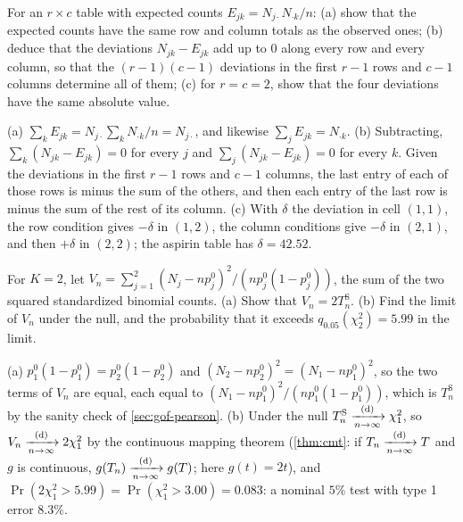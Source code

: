 \begin{exercise}
\label{ex:gof-table-df}
For an $r \times c$ table with expected counts $E_{jk} = N_{j\cdot}N_{\cdot k}/n$: (a) show that the expected counts have the same row and column totals as the observed ones; (b) deduce that the deviations $N_{jk} - E_{jk}$ add up to $0$ along every row and every column, so that the $(r - 1)(c - 1)$ deviations in the first $r - 1$ rows and $c - 1$ columns determine all of them; (c) for $r = c = 2$, show that the four deviations have the same absolute value.
\end{exercise}
\begin{solution}
(a) $\sum_kE_{jk} = N_{j\cdot}\sum_kN_{\cdot k}/n = N_{j\cdot}$, and likewise $\sum_jE_{jk} = N_{\cdot k}$. (b) Subtracting, $\sum_k(N_{jk} - E_{jk}) = 0$ for every $j$ and $\sum_j(N_{jk} - E_{jk}) = 0$ for every $k$. Given the deviations in the first $r - 1$ rows and $c - 1$ columns, the last entry of each of those rows is minus the sum of the others, and then each entry of the last row is minus the sum of the rest of its column. (c) With $\delta$ the deviation in cell $(1, 1)$, the row condition gives $-\delta$ in $(1, 2)$, the column conditions give $-\delta$ in $(2, 1)$, and then $+\delta$ in $(2, 2)$; the aspirin table has $\delta = 42.52$.
\end{solution}

\begin{exercise}
\label{ex:gof-naive}
For $K = 2$, let $V_n = \sum_{j=1}^2(N_j - np^0_j)^2/(np^0_j(1 - p^0_j))$, the sum of the two squared standardized binomial counts. (a) Show that $V_n = 2T^{\mathrm{S}}_n$. (b) Find the limit of $V_n$ under the null, and the probability that it exceeds $q_{0.05}(\chi^2_2) = 5.99$ in the limit.
\end{exercise}
\begin{solution}
(a) $p^0_1(1 - p^0_1) = p^0_2(1 - p^0_2)$ and $(N_2 - np^0_2)^2 = (N_1 - np^0_1)^2$, so the two terms of $V_n$ are equal, each equal to $(N_1 - np^0_1)^2/(np^0_1(1 - p^0_1))$, which is $T^{\mathrm{S}}_n$ by the sanity check of \cref{sec:gof-pearson}. (b) Under the null $T^{\mathrm{S}}_n \xrightarrow [n \to \infty ]{\text{(d)}} \chi^2_1$, so $V_n \xrightarrow [n \to \infty ]{\text{(d)}} 2\chi^2_1$ by the continuous mapping theorem (\cref{thm:cmt}: if $T_n \xrightarrow [n \to \infty ]{\text{(d)}} T$ and $g$ is continuous, $g(T_n) \xrightarrow [n \to \infty ]{\text{(d)}} g(T)$; here $g(t) = 2t$), and $\Pr(2\chi^2_1 > 5.99) = \Pr(\chi^2_1 > 3.00) = 0.083$: a nominal $5\%$ test with type 1 error $8.3\%$.
\end{solution}

